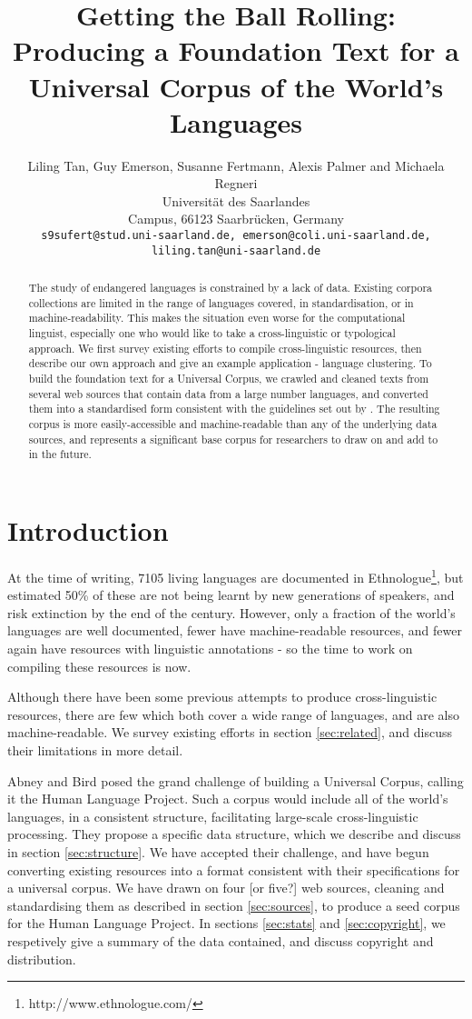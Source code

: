 \documentclass[11pt]{article}
\title{Getting the Ball Rolling: Producing a Foundation Text for a Universal Corpus of the World's Languages}
\author{Liling Tan, Guy Emerson, Susanne Fertmann, Alexis Palmer and Michaela Regneri \\
  Universität des Saarlandes \\
  Campus, 66123 Saarbrücken, Germany \\
  {\tt s9sufert@stud.uni-saarland.de, emerson@coli.uni-saarland.de,} \\
  {\tt liling.tan@uni-saarland.de}}
\date{}
\begin{document}
\maketitle
\begin{abstract}
The study of endangered languages is constrained by a lack of data. Existing corpora collections are limited in the range of languages covered, in standardisation, or in machine-readability. This makes the situation even worse for the computational linguist, especially one who would like to take a cross-linguistic or typological approach. We first survey existing efforts to compile cross-linguistic resources, then describe our own approach and give an example application - language clustering. To build the foundation text for a Universal Corpus, we crawled and cleaned texts from several web sources that contain data from a large number languages, and converted them into a standardised form consistent with the guidelines set out by . The resulting corpus is more easily-accessible and machine-readable than any of the underlying data sources, and represents a significant base corpus for researchers to draw on and add to in the future.
\end{abstract}

\section{Introduction}

At the time of writing, 7105 living languages are documented in Ethnologue\footnote{http://www.ethnologue.com/}, but  estimated 50\% of these are not being learnt by new generations of speakers, and risk extinction by the end of the century. However, only a fraction of the world's languages are well documented, fewer have machine-readable resources, and fewer again have resources with linguistic annotations \cite{maxwell2006annotation} - so the time to work on compiling these resources is now.

Although there have been some previous attempts to produce cross-linguistic resources, there are few which both cover a wide range of languages, and are also machine-readable. We survey existing efforts in section \ref{sec:related}, and discuss their limitations in more detail.

Abney and Bird  posed the grand challenge of building a Universal Corpus, calling it the Human Language Project. Such a corpus would include all of the world's languages, in a consistent structure, facilitating large-scale cross-linguistic processing. They propose a specific data structure, which we describe and discuss in section \ref{sec:structure}. We have accepted their challenge, and have begun converting existing resources into a format consistent with their specifications for a universal corpus. We have drawn on four [or five?] web sources, cleaning and standardising them as described in section \ref{sec:sources}, to produce a seed corpus for the Human Language Project. In sections \ref{sec:stats} and \ref{sec:copyright}, we respetively give a summary of the data contained, and discuss copyright and distribution.
\end{document}
